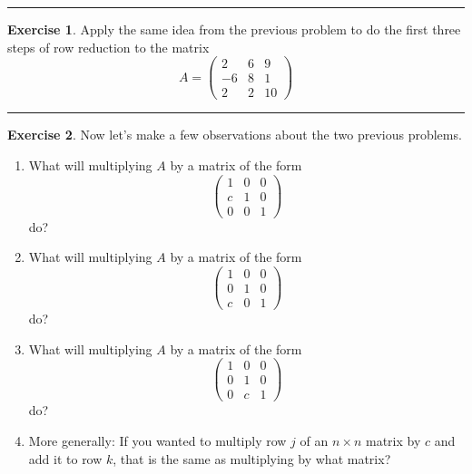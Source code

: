 \documentclass[
]{book}
\providecommand{\tightlist}{%
  \setlength{\itemsep}{0pt}\setlength{\parskip}{0pt}}
\theoremstyle{definition}
\theoremstyle{definition}
\theoremstyle{definition}
\newtheorem{exercise}{Exercise}[chapter]
\theoremstyle{remark}
\begin{document}
\begin{center}\rule{0.5\linewidth}{0.5pt}\end{center}

\begin{exercise}
\protect\hypertarget{exr:unnamed-chunk-315}{}{\label{exr:unnamed-chunk-315} }Apply the same idea from the previous problem to do the first three steps of row reduction to the matrix
\[ A = \begin{pmatrix} 2 & 6 & 9 \\ -6 & 8 & 1 \\ 2 & 2 & 10 \end{pmatrix} \]
\end{exercise}

\begin{center}\rule{0.5\linewidth}{0.5pt}\end{center}

\begin{exercise}
\protect\hypertarget{exr:unnamed-chunk-316}{}{\label{exr:unnamed-chunk-316} }Now let's make a few observations about the two previous problems.

\begin{enumerate}
\def\labelenumi{\alph{enumi}.}
\tightlist
\item
  What will multiplying \(A\) by a matrix of the form
  \[ \begin{pmatrix} 1 & 0 & 0 \\ c & 1 & 0 \\ 0 & 0 & 1 \end{pmatrix} \]
  do?
\item
  What will multiplying \(A\) by a matrix of the form
  \[ \begin{pmatrix} 1 & 0 & 0 \\ 0 & 1 & 0 \\ c & 0 & 1 \end{pmatrix} \]
  do?
\item
  What will multiplying \(A\) by a matrix of the form
  \[ \begin{pmatrix} 1 & 0 & 0 \\ 0 & 1 & 0 \\ 0 & c & 1 \end{pmatrix} \]
  do?
\item
  More generally: If you wanted to multiply row \(j\) of an \(n\times n\) matrix by \(c\) and add it to row \(k\), that is the same as multiplying by what matrix?
\end{enumerate}
\end{exercise}
\end{document}
